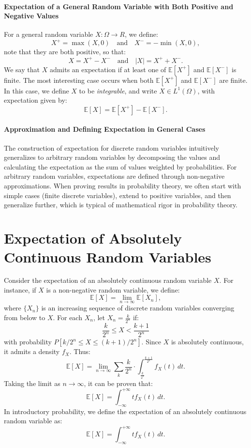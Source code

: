     \paragraph{Expectation of a General Random Variable with Both Positive and Negative Values}
    For a general random variable $X:\Omega \rightarrow R$, we define:
    \[
    X^+ = \max(X, 0) \quad \text{and} \quad X^- = -\min(X, 0),
    \]
    note that they are both positive, so that:
    \[
    X = X^+ - X^- \quad \text{and} \quad |X| = X^+ + X^-.
    \]
    We say that $X$ admits an expectation if at least one of $\mathbb{E}[X^+]$ and $\mathbb{E}[X^-]$ is finite. \newline
    The most interesting case occurs when both $\mathbb{E}[X^+]$ and $\mathbb{E}[X^-]$ are finite. In this case, we define $X$ to be \emph{integrable}, and write $X \in L^1(\Omega)$, with expectation given by:
    \[
    \mathbb{E}[X] = \mathbb{E}[X^+] - \mathbb{E}[X^-].
    \]
    
    \paragraph{Approximation and Defining Expectation in General Cases}
    The construction of expectation for discrete random variables intuitively generalizes to arbitrary random variables by decomposing the values and calculating the expectation as the sum of values weighted by probabilities. For arbitrary random variables, expectations are defined through non-negative approximations. \newline
    When proving results in probability theory, we often start with simple cases (finite discrete variables), extend to positive variables, and then generalize further, which is typical of mathematical rigor in probability theory.
    
    \section{Expectation of Absolutely Continuous Random Variables}
    
    Consider the expectation of an absolutely continuous random variable \( X \). For instance, if \( X \) is a non-negative random variable, we define:
    \[
    \mathbb{E}[X] = \lim_{n \to \infty} \mathbb{E}[X_n],
    \]
    where \(\{X_n\}\) is an increasing sequence of discrete random variables converging from below to \(X\). \newline
    For each \(X_n\), let \( X_n = \frac{k}{2^n} \) if:
    \[
    \frac{k}{2^n} \leq X < \frac{k+1}{2^n}
    \]
    with probability $P[k/2^n \leq X \leq (k+1)/2^n]$. Since \(X\) is absolutely continuous, it admits a density \(f_X\). Thus:
    \[
    \mathbb{E}[X] = \lim_{n \to \infty} \sum_{k} \frac{k}{2^n} \cdot \int_{\frac{k}{2^n}}^{\frac{k+1}{2^n}} f_X(t) \, dt.
    \]
    Taking the limit as \(n \to \infty\), it can be proven that:
    \[
    \mathbb{E}[X] = \int_{-\infty}^{+\infty} t f_X(t) \, dt.
    \]
    In introductory probability, we define the expectation of an absolutely continuous random variable as:
    \[
    \mathbb{E}[X] = \int_{-\infty}^{+\infty} t f_X(t) \, dt.
    \]
    
